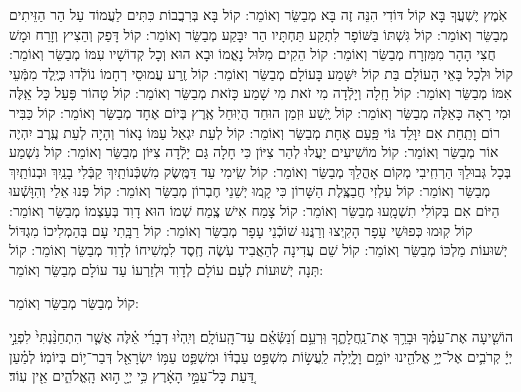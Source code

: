 \documentclass[twoside, openany, parskip=half, 11pt]{book}
\begin{document}
\begin{small}
אֹֽמֶץ יֶשְׁעֲךָ בָּא 			קוֹל דּוֹדִי הִנֵּה זֶה בָּא 			מְבַשֵּׂר וְאוֹמֵר: 
קוֹל בָּא בְּרִבֲבוֹת כִּתִּים 		לַעֲמוֹד עַל הַר הַזֵּיתִים 			מְבַשֵּׂר וְאוֹמֵר: 
קוֹל גִּשְׁתּוֹ בַּשּׁוֹפָר לִתְקַע 		תַּחְתָּיו הַר יִבָּקַע 			מְבַשֵּׂר וְאוֹמֵר: 
קוֹל דָּפַק וְהֵצִיץ וְזָרַח 			וּמָשׁ חֲצִי הָהָר מִמִּזְרָח 			מְבַשֵּׂר וְאוֹמֵר: 
קוֹל הֵקִים מִלּוּל נָאֳמוֹ 			וּבָא הוּא וְכָל קְדוֹשָׁיו עִמּוֹ 		מְבַשֵּׂר וְאוֹמֵר:
קוֹל וּלְכָל בָּאֵי הָעוֹלָם 			בַּת קוֹל יִשָּׁמַע בָּעוֹלָם 		מְבַשֵּׂר וְאוֹמֵר:
קוֹל זֶֽרַע עֲמוּסֵי רְחָמוֹ 			נוֹלְֿדוּ כְּיֶֽלֶד מִמְּֿעֵי אִמּוֹ 		מְבַשֵּׂר וְאוֹמֵר:
קוֹל חָֽלָה וְיָלְֿדָה מִי זֹאת 		מִי שָׁמַע כָּזֹאת 			מְבַשֵּׂר וְאוֹמֵר:
קוֹל טָהוֹר פָּעַל כָּל אֵֽלֶּה 		וּמִי רָאָה כָּאֵלֶּה 			מְבַשֵּׂר וְאוֹמֵר:
קוֹל יֶֽשַׁע וּזְמַן הוּחַד 			הֲיֽוּחַל אֶֽרֶץ בְּיוֹם אֶחָד 		מְבַשֵּׂר וְאוֹמֵר:
קוֹל כַּבִּיר רוֹם וָתַֽחַת 			אִם יִוָּלֵד גּוֹי פַּֽעַם אֶחָת 		מְבַשֵּׂר וְאוֹמֵר:
קוֹל לְעֵת יִגְאַל עַמּוֹ נָאוֹר 		וְהָיָה לְעֵת עֶֽרֶב יִהְיֶה אוֹר 		מְבַשֵּׂר וְאוֹמֵר:
קוֹל מוֹשִׁיעִים יַעֲלוּ לְהַר צִיּוֹן 		כִּי חָלָה גַּם יָלְֿדָה צִיּוֹן 			מְבַשֵּׂר וְאוֹמֵר:
קוֹל נִשְׁמַע בְּכָל גְּבוּלֵךְ 		הַרְחִֽיבִי מְקוֹם אָהֳלֵךְ 			מְבַשֵּׂר וְאוֹמֵר:
קוֹל שִֽׂימִי עַד דַּמֶּֽשֶׂק מִשְׁכְּֿנוֹתַֽיִךְ 	קַבְּֿלִי בָנַֽיִךְ וּבְנוֹתַֽיִךְ 			מְבַשֵּׂר וְאוֹמֵר:
קוֹל עִלְזִי חֲבַצֶּֽלֶת הַשָּׁרוֹן 		כִּי קָֽמוּ יְשֵׁנֵי חֶבְרוֹן 			מְבַשֵּׂר וְאוֹמֵר:
קוֹל פְּנוּ אֵלַי וְהִוָּשְֿׁעוּ 			הַיּוֹם אִם בְּקוֹלִי תִשְׁמָֽעוּ 		מְבַשֵּׂר וְאוֹמֵר:
קוֹל צָמַח אִישׁ צֶֽמַח שְׁמוֹ 		הוּא דָוִד בְּעַצְמוֹ 			מְבַשֵּׂר וְאוֹמֵר:
קוֹל קֽוּמוּ כְּפוּשֵׁי עָפָר 		הָקִֽיצוּ וְרַנֲּנוּ שׁוֹכְֿנֵי עָפָר 		מְבַשֵּׂר וְאוֹמֵר:
קוֹל רַבָּֽתִי עָם בְּהַמְלִיכוֹ 		מִגְדּוֹל יְשׁוּעוֹת מַלְכּוֹ 			מְבַשֵּׂר וְאוֹמֵר:
קוֹל שֵׁם עֲדִינָה לְהַאֲבִיד 		עֹֽשֶׂה חֶֽסֶד לִמְשִׁיחוֹ לְדָוִד 		מְבַשֵּׂר וְאוֹמֵר:
קוֹל תְּנָה יְשׁוּעוֹת לְעַם עוֹלָם 		לְדָוִד וּלְזַרְעוֹ עַד עוֹלָם 		מְבַשֵּׂר וְאוֹמֵר: 

\end{small}

\begin{large}
קוֹל מְבַשֵּׂר מְבַשֵּׂר וְאוֹמֵר:

\end{large}

הוֹשִׁ֤יעָה 
אֶת־עַמֶּ֗ךָ וּבָרֵ֥ךְ אֶת־נַֽחֲלָתֶ֑ךָ וּֽרְעֵ֥ם וְ֝נַשְּֿׂאֵ֗ם עַד־הָֽעוֹלָֽם׃ וְיִֽהְי֨וּ
 דְבָרַ֜י אֵ֗לֶּה אֲשֶׁ֤ר הִתְחַנַּ֨נְתִּי֙ לִפְנֵ֣י יְיָ֔ קְרֹבִ֛ים אֶל־יְיָ֥ אֱלֹהֵ֖ינוּ יוֹמָ֣ם וָלָ֑יְלָה לַֽעֲשׂ֣וֹת מִשְׁפַּ֣ט עַבְדּ֗וֹ וּמִשְׁפַּ֛ט עַמּ֥וֹ יִשְׂרָאֵ֖ל דְּבַר־י֥וֹם בְּיוֹמֽוֹ׃ לְמַ֗עַן דַּ֚עַת כָּל־עַמֵּ֣י הָאָ֔רֶץ כִּ֥י יְיָ֖ ה֣וּא הָֽאֱלֹהִ֑ים אֵ֖ין עֽוֹד׃

 \pageref{end of shacharis}
\end{document}
